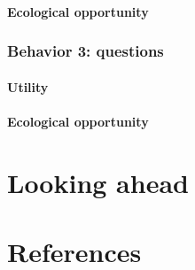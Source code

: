 \documentclass[a4paper,man,apacite,floatsintext]{apa6}
\begin{document}
\paragraph{Ecological opportunity}\label{ecological-opportunity-1}

\subsubsection{Behavior 3: questions}\label{behavior-3-questions}

\paragraph{Utility}\label{utility-2}

\paragraph{Ecological opportunity}\label{ecological-opportunity-2}

\section{Looking ahead}\label{looking-ahead}

\newpage

\section{References}\label{references}

\setlength{\parindent}{-0.1in} \setlength{\leftskip}{0.125in} \noindent


\end{document}
